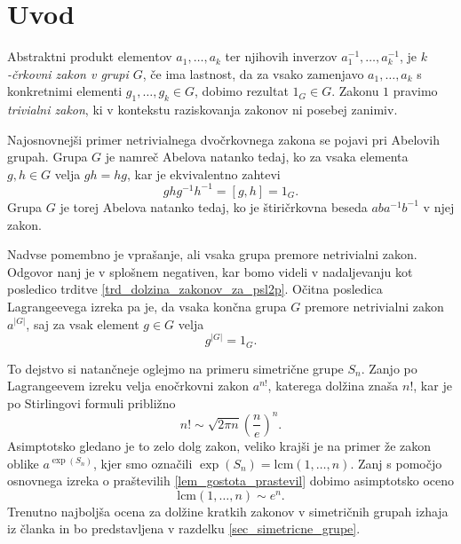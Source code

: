 \section{Uvod}

Abstraktni produkt elementov $a_1, \ldots , a_k$ ter njihovih inverzov $a_1^{-1}, \ldots , a_k^{-1}$, je \emph{$k$-črkovni zakon v grupi $G$}, če ima lastnost, da za vsako zamenjavo $a_1, \ldots, a_k$ s konkretnimi
elementi $g_1, \ldots, g_k \in G$, dobimo rezultat $1_G\in G$. Zakonu $1$ pravimo \emph{trivialni zakon}, ki v kontekstu raziskovanja zakonov ni posebej zanimiv.

Najosnovnejši primer netrivialnega dvočrkovnega zakona se pojavi pri Abelovih grupah. Grupa $G$ je namreč Abelova natanko tedaj, ko za vsaka elementa $g, h \in  G$ velja $gh = hg$, kar je ekvivalentno
zahtevi \begin{equation*}
ghg^{-1}h^{-1} = [g,h] = 1_G.
\end{equation*}
Grupa $G$ je torej Abelova natanko tedaj, ko je štiričrkovna beseda $aba^{-1}b^{-1}$ v njej zakon. 

Nadvse pomembno je vprašanje, ali vsaka grupa premore netrivialni zakon. Odgovor nanj je v splošnem negativen, kar bomo videli v nadaljevanju kot posledico trditve \ref{trd_dolzina_zakonov_za_psl2p}. 
Očitna posledica Lagrangeevega izreka pa je, da vsaka končna grupa $G$ premore
netrivialni zakon $a^{\lvert G \rvert }$, saj za vsak element $g \in G$ velja  
\begin{equation*}
g^{\lvert G \rvert } = 1_G.
\end{equation*}  

To dejstvo si natančneje oglejmo na primeru simetrične grupe $S_n$. Zanjo po Lagrangeevem izreku velja enočrkovni zakon $a^{n !}$, katerega dolžina znaša $n!$, kar je po Stirlingovi formuli približno
\begin{equation*}
n! \sim \sqrt{2 \pi n} \left( \frac{n}{e} \right)^{n}.
\end{equation*}  
Asimptotsko gledano je to zelo dolg zakon, veliko krajši je na primer že zakon oblike $a^{\exp(S_n)}$, kjer smo označili $\exp(S_n) = \text{lcm}(1, \ldots, n)$. Zanj s pomočjo osnovnega izreka o praštevilih \ref{lem_gostota_prastevil} dobimo asimptotsko oceno \begin{equation*}
\text{lcm}(1, \ldots ,n) \sim e^{n}.
\end{equation*}  
Trenutno najboljša ocena za dolžine kratkih zakonov v simetričnih grupah izhaja iz članka \cite{Kozma_Thom_2016} in bo predstavljena v razdelku \ref{sec_simetricne_grupe}.

